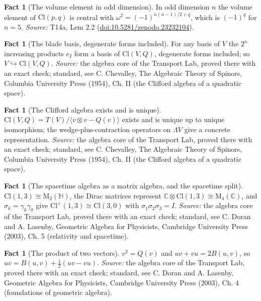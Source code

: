 \documentclass[11pt]{article}
\theoremstyle{definition}
\newtheorem{fact}[theorem]{Fact}
\theoremstyle{plain}
\providecommand{\C}{}\renewcommand{\C}{\mathbb{C}}
\providecommand{\Cl}{}\renewcommand{\Cl}{\mathrm{Cl}}
\providecommand{\HH}{}\renewcommand{\HH}{\mathbb{H}}
\providecommand{\Mat}{}\renewcommand{\Mat}{\mathrm{M}}
\begin{document}
\begin{fact}[The volume element in odd dimension]\label{c:odd-extensions.volume-element-odd-dimension}
In odd dimension $n$ the volume element of $\Cl(p,q)$ is central with $\omega^{2} = (-1)^{n(n-1)/2 + q}$, which is $(-1)^{q}$ for $n = 5$.
\emph{Source:} T14a, Lem 2.2 (\href{https://doi.org/10.5281/zenodo.23232104}{doi:10.5281/zenodo.23232104}).
\end{fact}

\begin{fact}[The blade basis, degenerate forms included]\label{c:std-algebra.blade-basis}
For any basis of $V$ the $2^{n}$ increasing products $e_I$ form a basis of $\Cl(V, Q)$, degenerate forms included; so $V \hookrightarrow \Cl(V, Q)$.
\emph{Source:} the algebra core of the Transport Lab, proved there with an exact check; standard, see C. Chevalley, The Algebraic Theory of Spinors, Columbia University Press (1954), Ch. II (the Clifford algebra of a quadratic space).
\end{fact}

\begin{fact}[The Clifford algebra exists and is unique]\label{c:std-algebra.existence-uniqueness}
$\Cl(V, Q) = T(V)/\langle v \otimes v - Q(v) \rangle$ exists and is unique up to unique isomorphism; the wedge-plus-contraction operators on $\Lambda V$ give a concrete representation.
\emph{Source:} the algebra core of the Transport Lab, proved there with an exact check; standard, see C. Chevalley, The Algebraic Theory of Spinors, Columbia University Press (1954), Ch. II (the Clifford algebra of a quadratic space).
\end{fact}

\begin{fact}[The spacetime algebra as a matrix algebra, and the spacetime split]\label{c:std-algebra.sta-matrix}
$\Cl(1,3) \cong \Mat_2(\HH)$, the Dirac matrices represent $\C \otimes \Cl(1,3) \cong \Mat_4(\C)$, and $\sigma_k = \gamma_k\gamma_0$ give $\Cl^{+}(1,3) \cong \Cl(3,0)$ with $\sigma_1\sigma_2\sigma_3 = I$.
\emph{Source:} the algebra core of the Transport Lab, proved there with an exact check; standard, see C. Doran and A. Lasenby, Geometric Algebra for Physicists, Cambridge University Press (2003), Ch. 5 (relativity and spacetime).
\end{fact}

\begin{fact}[The product of two vectors]\label{c:std-algebra.vector-squares}
$v^{2} = Q(v)$ and $uv + vu = 2B(u, v)$, so $uv = B(u, v) + \tfrac12(uv - vu)$.
\emph{Source:} the algebra core of the Transport Lab, proved there with an exact check; standard, see C. Doran and A. Lasenby, Geometric Algebra for Physicists, Cambridge University Press (2003), Ch. 4 (foundations of geometric algebra).
\end{fact}
\end{document}
